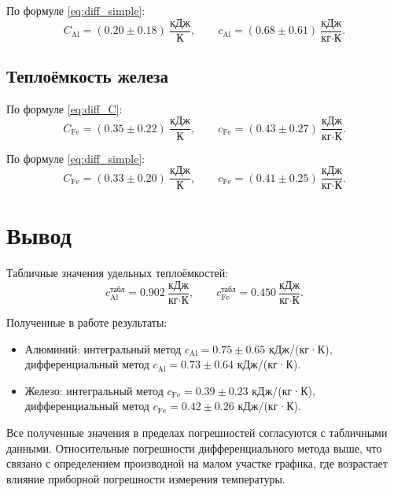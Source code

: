 \documentclass[a4paper,12pt]{article}
\begin{document}
По формуле \eqref{eq:diff_simple}:
\begin{equation}
    C_{\text{Al}} = (0.20 \pm 0.18) \ \frac{\text{кДж}}{\text{К}}, \qquad
    c_{\text{Al}} = (0.68 \pm 0.61) \ \frac{\text{кДж}}{\text{кг} \cdot \text{К}}.
\end{equation}

\subsection{Теплоёмкость железа}

По формуле \eqref{eq:diff_C}:
\begin{equation}
    C_{\text{Fe}} = (0.35 \pm 0.22) \ \frac{\text{кДж}}{\text{К}}, \qquad
    c_{\text{Fe}} = (0.43 \pm 0.27) \ \frac{\text{кДж}}{\text{кг} \cdot \text{К}}.
\end{equation}

По формуле \eqref{eq:diff_simple}:
\begin{equation}
    C_{\text{Fe}} = (0.33 \pm 0.20) \ \frac{\text{кДж}}{\text{К}}, \qquad
    c_{\text{Fe}} = (0.41 \pm 0.25) \ \frac{\text{кДж}}{\text{кг} \cdot \text{К}}.
\end{equation}

\section{Вывод}
Табличные значения удельных теплоёмкостей:
\begin{equation}
    c_{\text{Al}}^{\text{табл}} = 0.902 \ \frac{\text{кДж}}{\text{кг} \cdot \text{К}}, \qquad
    c_{\text{Fe}}^{\text{табл}} = 0.450 \ \frac{\text{кДж}}{\text{кг} \cdot \text{К}}.
\end{equation}

Полученные в работе результаты:
\begin{itemize}
    \item Алюминий: интегральный метод $c_{\text{Al}} = 0.75 \pm 0.65$ кДж/(кг·К), дифференциальный метод $c_{\text{Al}} = 0.73 \pm 0.64$ кДж/(кг·К).
    \item Железо: интегральный метод $c_{\text{Fe}} = 0.39 \pm 0.23$ кДж/(кг·К), дифференциальный метод $c_{\text{Fe}} = 0.42 \pm 0.26$ кДж/(кг·К).
\end{itemize}

Все полученные значения в пределах погрешностей согласуются с табличными данными. Относительные погрешности дифференциального метода выше, что связано с определением производной на малом участке графика, где возрастает влияние приборной погрешности измерения температуры.
\end{document}
